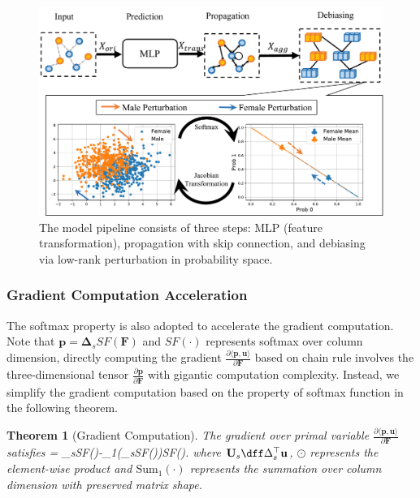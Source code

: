 \documentclass[letterpaper]{article} %
\theoremstyle{plain}
\newtheorem{theorem}{Theorem}[section]
\theoremstyle{definition}
\theoremstyle{remark}
\begin{document}
\begin{figure}[t]
\centering
\includegraphics[width=0.95\linewidth]{fmp_interp.pdf}

\caption{The model pipeline consists of three steps: MLP (feature transformation), propagation with skip connection, and debiasing via low-rank perturbation in probability space. }
\label{fig:illu}
\end{figure}



\subsubsection{Gradient Computation Acceleration}
The softmax property is also adopted to accelerate the gradient computation. Note that $\mathbf{p}=\mathbf{\Delta}_s SF(\mathbf{F})$ and $SF(\cdot)$ represents softmax over column dimension, directly computing the gradient $\frac{\partial \langle \mathbf{p}, \mathbf{u}\rangle}{\partial \mathbf{F}}$ based on chain rule involves the three-dimensional tensor $\frac{\partial \mathbf{p}}{\partial \mathbf{F}}$ with gigantic computation complexity. Instead, we simplify the gradient computation based on the property of softmax function in the following theorem.

\begin{theorem}[Gradient Computation]\label{theo:grad_comp}
The gradient over primal variable $\frac{\partial \langle \mathbf{p}, \mathbf{u}\rangle}{\partial \mathbf{F}}$ satisfies
\be
{}= _s\odot SF()-_{1}(_s\odot SF())SF().
\ee
where $\mathbf{U}_s\dff \Delta_s^{\top}\mathbf{u}$, $\odot$ represents the element-wise product and $\text{Sum}_{1}(\cdot)$ represents the summation over column dimension with preserved matrix shape.
\end{theorem}
\end{document}

